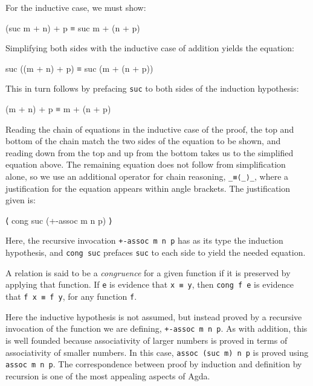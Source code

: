 For the inductive case, we must show:

\begin{myDisplay}
(suc m + n) + p ≡ suc m + (n + p)
\end{myDisplay}

Simplifying both sides with the inductive case of addition yields the
equation:

\begin{myDisplay}
suc ((m + n) + p) ≡ suc (m + (n + p))
\end{myDisplay}

This in turn follows by prefacing \texttt{suc} to both sides of the
induction hypothesis:

\begin{myDisplay}
(m + n) + p ≡ m + (n + p)
\end{myDisplay}

Reading the chain of equations in the inductive case of the proof, the
top and bottom of the chain match the two sides of the equation to be
shown, and reading down from the top and up from the bottom takes us to
the simplified equation above. The remaining equation does not follow
from simplification alone, so we use an additional operator for chain
reasoning, \texttt{\_≡⟨\_⟩\_}, where a justification for the equation
appears within angle brackets. The justification given is:

\begin{myDisplay}
⟨ cong suc (+-assoc m n p) ⟩
\end{myDisplay}

Here, the recursive invocation \texttt{+-assoc\ m\ n\ p} has as its type
the induction hypothesis, and \texttt{cong\ suc} prefaces \texttt{suc}
to each side to yield the needed equation.

A relation is said to be a \emph{congruence} for a given function if it
is preserved by applying that function. If \texttt{e} is evidence that
\texttt{x\ ≡\ y}, then \texttt{cong\ f\ e} is evidence that
\texttt{f\ x\ ≡\ f\ y}, for any function \texttt{f}.

Here the inductive hypothesis is not assumed, but instead proved by a
recursive invocation of the function we are defining,
\texttt{+-assoc\ m\ n\ p}. As with addition, this is well founded
because associativity of larger numbers is proved in terms of
associativity of smaller numbers. In this case,
\texttt{assoc\ (suc\ m)\ n\ p} is proved using \texttt{assoc\ m\ n\ p}.
The correspondence between proof by induction and definition by
recursion is one of the most appealing aspects of Agda.

